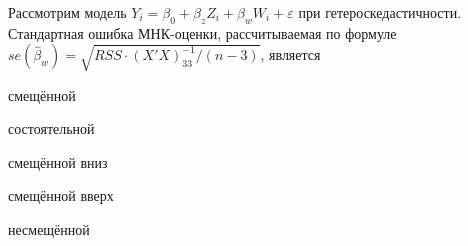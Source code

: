 
\begin{question}
Рассмотрим модель
\(Y_i= \beta_0 + \beta_z Z_{i} + \beta_w W_{i} + \varepsilon\) при
гетероскедастичности. Стандартная ошибка МНК-оценки, рассчитываемая по
формуле \(se(\hat\beta_w)=\sqrt{RSS \cdot (X'X)^{-1}_{33}/(n-3)}\),
является
\begin{answerlist}
  \item смещённой
  \item состоятельной
  \item смещённой вниз
  \item смещённой вверх
  \item несмещённой
\end{answerlist}
\end{question}


